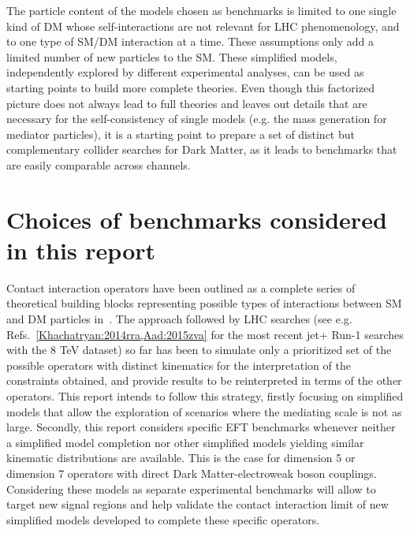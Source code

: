 The particle content of the models chosen as benchmarks is limited to
one single kind of DM whose self-interactions are not relevant for LHC
phenomenology, and to one type of SM/DM interaction at a time. These
assumptions only add a limited number of new particles to the
SM. These simplified models, independently explored by different
experimental analyses, can be used as starting points to build more
complete theories. Even though this factorized picture does not always
lead to full theories and leaves out details that are necessary for
the self-consistency of single models (e.g. the mass generation for
mediator particles), it is a starting point to prepare a set of
distinct but complementary collider searches for Dark Matter, as
it leads to benchmarks that are easily comparable across channels.

\section{Choices of benchmarks considered in this report}

Contact interaction operators have been outlined as a complete series of theoretical
building blocks representing possible types of interactions between SM and DM particles
in~\cite{Goodman:2010ku}. The approach followed by LHC searches (see e.g. Refs.~\ref{Khachatryan:2014rra,Aad:2015zva} 
for the most recent jet+\MET{} Run-1 searches with the 8 TeV dataset) 
so far has been to simulate only a prioritized set of the possible operators with distinct kinematics
for the interpretation of the constraints obtained, and provide results to be reinterpreted in terms of the other operators.
This report intends to follow this strategy, firstly focusing on simplified models that allow the exploration 
of scenarios where the mediating scale is not as large.  
Secondly, this report considers specific EFT benchmarks 
whenever neither a simplified model completion 
nor other simplified models yielding similar kinematic distributions are available. 
This is the case for dimension 5 or dimension 7 operators with direct 
Dark Matter-electroweak boson couplings. 
Considering these models as separate experimental benchmarks 
will allow to target new signal regions and help validate the 
contact interaction limit of new simplified models 
developed to complete these specific operators. 

